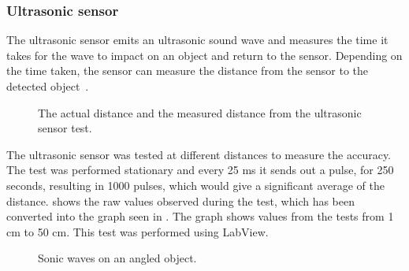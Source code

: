 \subsubsection{Ultrasonic sensor} \label{sec:ultrasonic_sensor}
The ultrasonic sensor emits an ultrasonic sound wave and measures the time it takes for the wave to impact on an object and return to the sensor. Depending on the time taken, the sensor can measure the distance from the sensor to the detected object~\citep{lego_education}. 

\begin{figure}[H]
     \caption{\label{fig:ultrasonic_sensor_test_graph} The actual distance and the measured distance from the ultrasonic sensor test.}
\end{figure}

The ultrasonic sensor was tested at different distances to measure the accuracy. The test was performed stationary and every 25 ms it sends out a pulse, for 250 seconds, resulting in 1000 pulses, which would give a significant average of the distance.  shows the raw values observed during the test, which has been converted into the graph seen in . The graph shows values from the tests from 1 cm to 50 cm. This test was performed using LabView.

\begin{figure}[H]
     \caption{\label{fig:angled_object} Sonic waves on an angled object.}
\end{figure}

